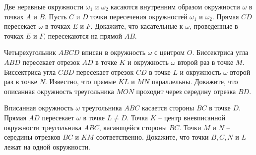 \documentclass{article}
\begin{document}
\begin{enumerate_boxed}
        \item Две неравные окружности $\omega_1$ и $\omega_2$ касаются внутренним образом окружности $\omega$ в точках $A$ и $B$.
        Пусть $C$ и $D$ точки пересечения окружностей $\omega_1$ и $\omega_2$.
        Прямая $CD$ пересекает $\omega$ в точках $E$ и $F$.
        Докажите, что касательные к $\omega$, проведенные в точках $E$ и $F$, пересекаются на прямой $AB$.

        \item Четырехугольник $ABCD$ вписан в окружность $\omega$ с центром $O$.
        Биссектриса угла $ABD$ пересекает отрезок $AD$ в точке $K$ и окружность $\omega$ второй раз в точке $M$.
        Биссектриса угла $CBD$ пересекает отрезок $CD$ в точке $L$ и окружность $\omega$ второй раз в точке $N$.
        Известно, что прямые $KL$ и $MN$ параллельны.
        Докажите, что описанная окружность треугольника $MON$ проходит через середину отрезка $BD$.

        \item Вписанная окружность $\omega$ треугольника $ABC$ касается стороны $BC$ в точке $D$.
        Прямая $AD$ пересекает $\omega$ в точке $L \neq D$.
        Точка $K$ – центр вневписанной окружности треугольника $ABC$, касающейся стороны $BC$.
        Точки $M$ и $N$ – середины отрезков $BC$ и $KM$ соответственно.
        Докажите, что точки $B, C, N$ и $L$ лежат на одной окружности.

    \end{enumerate_boxed}
\end{document}
